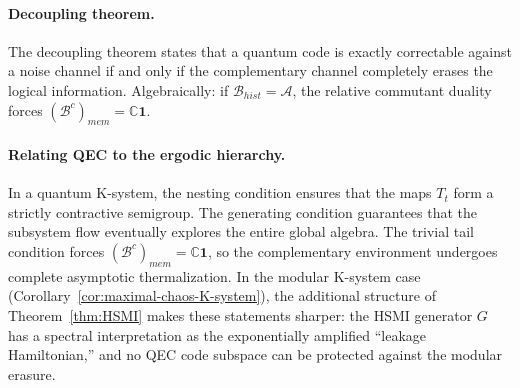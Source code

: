 \documentclass[a4paper,11pt]{article}
\theoremstyle{definition}
\theoremstyle{remark}
\begin{document}
\paragraph{Decoupling theorem.}
The decoupling theorem states that a quantum code is exactly correctable against a
noise channel if and only if the complementary channel completely erases the logical
information.  Algebraically: if $\mathcal{B}_{hist} = \mathcal{A}$, the relative
commutant duality forces $(\mathcal{B}^c)_{mem} = \mathbb{C}\mathbf{1}$.
 
\paragraph{Relating QEC to the ergodic hierarchy.}
In a quantum K-system, the nesting condition ensures that the maps $T_t$ form a
strictly contractive semigroup.  The generating condition guarantees that the subsystem
flow eventually explores the entire global algebra.  The trivial tail condition forces
$(\mathcal{B}^c)_{mem}=\mathbb{C}\mathbf{1}$, so the complementary environment
undergoes complete asymptotic thermalization.  In the modular K-system case
(Corollary~\ref{cor:maximal-chaos-K-system}), the additional structure of
Theorem~\ref{thm:HSMI} makes these statements sharper: the HSMI generator $G$ has a
spectral interpretation as the exponentially amplified ``leakage Hamiltonian,'' and no
QEC code subspace can be protected against the modular erasure.
\endgroup
 



\end{document}
